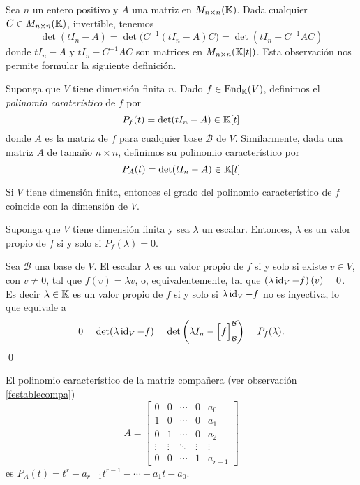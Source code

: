 \begin{obs}
Sea $n$ un entero positivo y $A$ una matriz en $M_{n\times n}(\mathbb{K})$. Dada cualquier $C\in M_{n\times n}(\mathbb{K})$, invertible, tenemos
\[
\det(t I_n-A)=\det\Big(C^{-1}(t I_n-A)C\Big)=\det(t I_n-C^{-1}AC)
\]
donde $t I_n-A$ y $t I_n-C^{-1}AC$ son matrices en $M_{n\times n}(\mathbb{K}[t])$. Esta observaci\'on nos permite formular la siguiente definici\'on.
\end{obs}

\begin{defn}
Suponga que $V$ tiene dimensi\'on finita $n$. Dado $f\in\operatorname{End}_{\mathbb{K}}(V)$, definimos el \emph{polinomio carater\'istico} de $f$ por
\[
P_f(t)=\det(t I_n-A)\in \mathbb{K}[t]
\]
donde $A$ es la matriz de $f$ para cualquier base $\mathcal{B}$ de $V$. Similarmente, dada una matriz $A$ de tamaño $n\times n$, definimos su polinomio característico por
\[
P_A(t)=\det(t I_n-A)\in \mathbb{K}[t]
\]
\end{defn}

\begin{obs}\label{dimension_y_grado_del_caracteristico}
  Si $V$ tiene dimensión finita, entonces el grado del polinomio característico de $f$ coincide con la dimensión de $V$.
\end{obs}

\begin{teo}
Suponga que $V$ tiene dimensi\'on finita y sea $\lambda$ un escalar. Entonces, $\lambda$ es un valor propio de $f$ si y solo si $P_f(\lambda)=0$.
\end{teo}

\dem Sea $\mathcal{B}$ una base de $V$. El escalar $\lambda$ es un valor propio de $f$ si y solo si existe $v\in V$, con $v\ne 0$, tal que $f(v)=\lambda v$, o, equivalentemente, tal que $\left(\lambda\operatorname{id}_V-f\right)(v)=0$. Es decir $\lambda\in \mathbb{K}$ es un valor propio de $f$ si y solo si $\lambda\operatorname{id}_V-f$ no es inyectiva, lo que equivale a
\[
0=\det(\lambda\operatorname{id}_V-f)=\det\left(\lambda I_n-\Big[f\Big]^{\mathcal{B}}_{\mathcal{B}}\right)=P_f(\lambda).
\]
\qed

\begin{obs}\label{observacionesparacayleyhamilton}
  El polinomio característico de la matriz compañera (ver observación \ref{festablecompa})
  $$
  A=\left[\begin{array}{ccccc}
    0 & 0 & \cdots & 0 & a_0\\
    1 & 0 & \cdots & 0 & a_1\\
    0 & 1 & \cdots & 0 & a_2\\
    \vdots & \vdots & \ddots & \vdots & \vdots\\
    0 & 0 & \cdots & 1 & a_{r-1}
  \end{array}\right]
  $$
  es $P_A(t)=t^r-a_{r-1}t^{r-1}-\cdots-a_1t-a_0$.
\end{obs}

